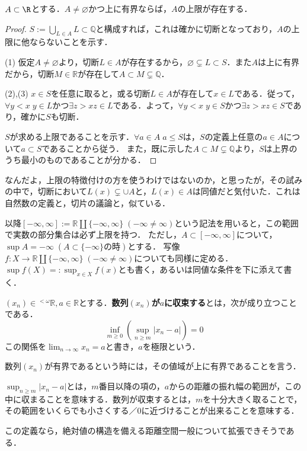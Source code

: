 \documentclass[uplatex,dvipdfmx]{jsreport}
\begin{document}
\begin{theorem}[実数の連続性]\label{thm-Weierstrass's-supremum-axiom}
    $A\subset\R$とする．$A\ne\varnothing$かつ上に有界ならば，$A$の上限が存在する．
\end{theorem}
\begin{proof}
    $S:=\bigcup_{L\in A}L\subset\mathbb{Q}$と構成すれば，これは確かに切断となっており，$A$の上限に他ならないことを示す．

    (1) 仮定$A\ne\varnothing$より，切断$L\in A$が存在するから，$\varnothing\subsetneq L\subset S$．また$A$は上に有界だから，切断$M\in\mathbb{R}$が存在して$A\subset M\subsetneq\mathbb{Q}$．
    
    (2),(3) $x\in S$を任意に取ると，或る切断$L\in A$が存在して$x\in L$である．従って，$\forall y<x\; y\in L$かつ$\exists z>x z\in L$である．よって，$\forall y<x\; y\in S$かつ$\exists z>x z\in S$であり，確かに$S$も切断．

    $S$が求める上限であることを示す．$\forall a\in A\; a\le S$は，$S$の定義上任意の$a\in A$について$a\subset S$であることから従う．
    また，既に示した$A\subset M\subsetneq\mathbb{Q}$より，$S$は上界のうち最小のものであることが分かる．
\end{proof}
\begin{remark}
    なんだよ，上限の特徴付けの方を使うわけではないのか，と思ったが，その試みの中で，切断において$L(x)\subsetneq \cup A$と，$L(x)\in A$は同値だと気付いた．これは自然数の定義と，切片の議論と，似ている．
\end{remark}

\begin{notation}
    以降$[-\infty,\infty]:=\mathbb{R}\coprod\{-\infty,\infty\}\;(-\infty\ne\infty)$という記法を用いると，この範囲で実数の部分集合は必ず上限を持つ．
    ただし，$A\subset [-\infty,\infty]$について，$\sup A=-\infty \; (A\subset \{-\infty\}の時)$とする．
    写像$f:X\to\mathbb{R}\coprod\{-\infty,\infty\}\;(-\infty\ne\infty)$についても同様に定める．
    $\sup f(X)=:\sup_{x\in X}f(x)$とも書く，あるいは同値な条件を下に添えて書く．
\end{notation}

\begin{definition}[実数列の収束]
    $(x_n)\in{}^{<\omega}\mathbb{R},a\in\mathbb{R}$とする．\textbf{数列$(x_n)$が$a$に収束する}とは，次が成り立つことである．
    \[ \inf_{m\ge 0}\left(\sup_{n\ge m}|x_n-a|\right)=0 \]
    この関係を$\lim_{n\to\infty}x_n=a$と書き，$a$を極限という．

    数列$(x_n)$が有界であるという時には，その値域が上に有界であることを言う．
\end{definition}
\begin{remark}
    $\sup_{n\ge m}|x_n-a|$とは，$m$番目以降の項の，$a$からの距離の振れ幅の範囲が，この中に収まることを意味する．数列が収束するとは，$m$を十分大きく取ることで，その範囲をいくらでも小さくする／$0$に近づけることが出来ることを意味する．

    この定義なら，絶対値の構造を備える距離空間一般について拡張できそうである．
\end{remark}
\end{document}
